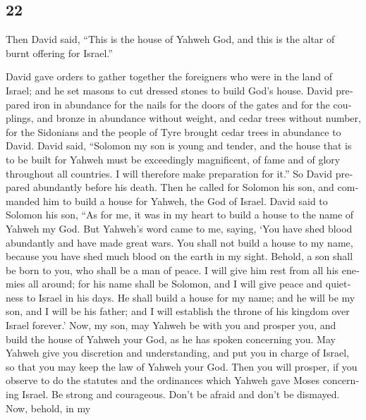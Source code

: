 \begin{paracol}{2}
\switchcolumn
\begin{otherlanguage}{english}

\hypertarget{section-43}{%
\section{22}\label{section-43}}

 Then David said, ``This is the house of Yahweh God, and
this is the altar of burnt offering for Israel.''

 David gave orders to gather together the foreigners who
were in the land of Israel; and he set masons to cut dressed stones to
build God's house.  David prepared iron in abundance for
the nails for the doors of the gates and for the couplings, and bronze
in abundance without weight,  and cedar trees without
number, for the Sidonians and the people of Tyre brought cedar trees in
abundance to David.  David said, ``Solomon my son is young
and tender, and the house that is to be built for Yahweh must be
exceedingly magnificent, of fame and of glory throughout all countries.
I will therefore make preparation for it.'' So David prepared abundantly
before his death.  Then he called for Solomon his son, and
commanded him to build a house for Yahweh, the God of Israel.
 David said to Solomon his son, ``As for me, it was in my
heart to build a house to the name of Yahweh my God.  But
Yahweh's word came to me, saying, `You have shed blood abundantly and
have made great wars. You shall not build a house to my name, because
you have shed much blood on the earth in my sight. 
Behold, a son shall be born to you, who shall be a man of peace. I will
give him rest from all his enemies all around; for his name shall be
Solomon, and I will give peace and quietness to Israel in his days.
 He shall build a house for my name; and he will be my
son, and I will be his father; and I will establish the throne of his
kingdom over Israel forever.'  Now, my son, may Yahweh be
with you and prosper you, and build the house of Yahweh your God, as he
has spoken concerning you.  May Yahweh give you
discretion and understanding, and put you in charge of Israel, so that
you may keep the law of Yahweh your God.  Then you will
prosper, if you observe to do the statutes and the ordinances which
Yahweh gave Moses concerning Israel. Be strong and courageous. Don't be
afraid and don't be dismayed.  Now, behold, in my

\end{otherlanguage}
\end{paracol}
